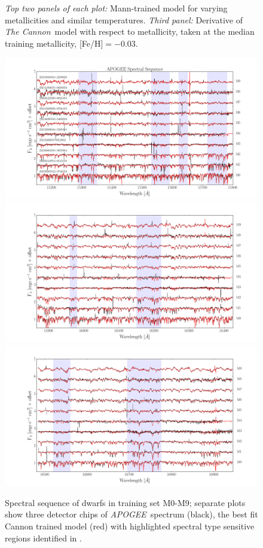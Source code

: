 \documentclass[modern]{aastex62}
\newcommand{\apogee}{\textsl{APOGEE}}
\newcommand{\thecannon}{\textsl{The Cannon}}
\begin{document}
\begin{figure}[ht]
\begin{center}
\end{center}
\caption{\textit{Top two panels of each plot:} Mann-trained model for varying metallicities and similar temperatures. \textit{Third panel:} Derivative of \thecannon\ model with respect to metallicity, taken at the median training metallicity, [Fe/H]$=-0.03$.} \label{fig:demo_feh}
\end{figure}

\begin{figure}[ht]
\begin{center}
\includegraphics[width=12cm]{figures/Spectral_Sequence_1.png}
\includegraphics[width=12cm]{figures/Spectral_Sequence_2.png}
\includegraphics[width=12cm]{figures/Spectral_Sequence_3.png}
\end{center}
\caption{Spectral sequence of dwarfs in training set M0-M9; separate plots show three detector chips of \apogee\ spectrum (black), the best fit Cannon trained model (red) with highlighted spectral type sensitive regions identified in \citealt{Desphande:2013}.} \label{fig:sp_sequence}
\end{figure}
\end{document}
